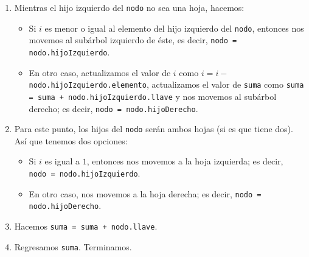 \documentclass[letterpaper,11pt]{article}
\begin{document}
\begin{enumerate}
\begin{itemize}
\begin{enumerate}
            \item Mientras el hijo izquierdo del \texttt{nodo} no sea una 
            hoja, hacemos:
            \begin{itemize}
                \item Si $i$ es menor o igual al elemento del hijo izquierdo 
                del \texttt{nodo}, entonces nos movemos al subárbol izquierdo 
                de éste, es decir, \texttt{nodo = nodo.hijoIzquierdo}.

                \item En otro caso, actualizamos el valor de $i$ como 
                $i = i -$ \texttt{nodo.hijoIzquierdo.elemento}, actualizamos 
                el valor de \texttt{suma} como 
                \texttt{suma = suma + nodo.hijoIzquierdo.llave} y nos movemos 
                al subárbol derecho; es decir, \texttt{nodo = nodo.hijoDerecho}.
            \end{itemize}

            \item Para este punto, los hijos del \texttt{nodo} serán ambos 
            hojas (si es que tiene dos). Así que tenemos dos opciones:
            \begin{itemize}
                \item Si $i$ es igual a $1$, entonces nos movemos a la 
                hoja izquierda; es decir, \\ 
                \texttt{nodo = nodo.hijoIzquierdo}.

                \item En otro caso, nos movemos a la hoja derecha; es decir, 
                \texttt{nodo = nodo.hijoDerecho}.
            \end{itemize}

            \item Hacemos \texttt{suma = suma + nodo.llave}. 
            
            \item Regresamos \texttt{suma}. Terminamos.
        \end{enumerate}


\end{itemize}
\end{enumerate}
\end{document}
